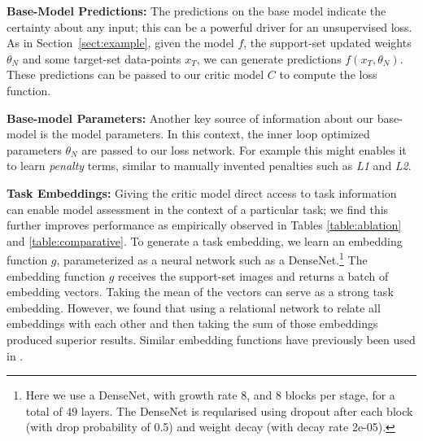 \documentclass{article} \usepackage[dvipsnames]{xcolor}
\begin{document}
\textbf{Base-Model Predictions:}
The predictions on the base model indicate the certainty about any input; this can be a powerful driver for an unsupervised loss. As in Section~\ref{sect:example}, given the model $f$, the support-set updated weights $\theta_N$ and some target-set data-points $x_T$, we can generate predictions $f(x_T, \theta_N)$. These predictions can be passed to our critic model $C$ to compute the loss function.

\textbf{Base-model Parameters:}
Another key source of information about our base-model is the model parameters. In this context, the inner loop optimized parameters $\theta_N$ are passed to our loss network. For example this might enables it to learn \emph{penalty} terms, similar to manually invented penalties such as \emph{L1} and \emph{L2}.

\textbf{Task Embeddings:}\label{task-embedding-conditioning}
Giving the critic model direct access to task information can enable model assessment in the context of a particular task; we find this further improves performance as empirically observed in Tables \ref{table:ablation} and \ref{table:comparative}. To generate a task embedding, we learn an embedding function $g$, parameterized as a neural network such as a DenseNet.\footnote{Here we use a DenseNet, with growth rate 8, and 8 blocks per stage, for a total of 49 layers. The DenseNet is reqularised using dropout after each block (with drop probability of 0.5) and weight decay (with decay rate 2e-05).} The embedding function $g$ receives the support-set images and returns a batch of embedding vectors. Taking the mean of the vectors can serve as a strong task embedding. However, we found that using a relational network to relate all embeddings with each other and then taking the sum of those embeddings produced superior results. Similar embedding functions have previously been used in \citep{rusu2018meta}. 
\end{document}
